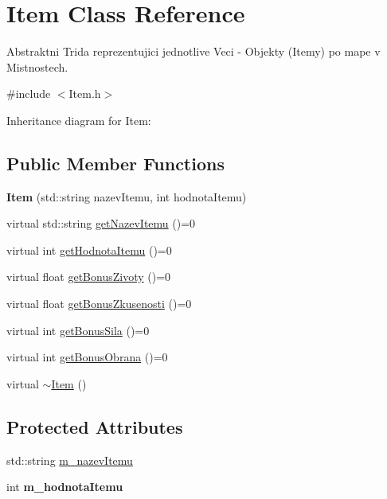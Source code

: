 \hypertarget{class_item}{\section{Item Class Reference}
\label{class_item}
}


Abstraktni Trida reprezentujici jednotlive Veci -\/ Objekty (Itemy) po mape v Mistnostech.  




{\ttfamily \#include $<$Item.\-h$>$}



Inheritance diagram for Item\-:
\subsection*{Public Member Functions}
\begin{DoxyCompactItemize}
\item 
\hypertarget{class_item_a7f5571a473f785b279be592bf086aa8b}{{\bfseries Item} (std\-::string nazev\-Itemu, int hodnota\-Itemu)}\label{class_item_a7f5571a473f785b279be592bf086aa8b}

\item 
virtual std\-::string \hyperlink{class_item_af1d886066fa410a6817ee8ec32ab8be6}{get\-Nazev\-Itemu} ()=0
\item 
virtual int \hyperlink{class_item_aa0d6f7871e3f0e3bdba941f875f59ac4}{get\-Hodnota\-Itemu} ()=0
\item 
virtual float \hyperlink{class_item_af267b55b4ed21ce91e3512f80cc96109}{get\-Bonus\-Zivoty} ()=0
\item 
virtual float \hyperlink{class_item_a004a3bc6615a7c9b31a8d0fb59d4a3ff}{get\-Bonus\-Zkusenosti} ()=0
\item 
virtual int \hyperlink{class_item_aa7b177491904b942b256491ba2551f10}{get\-Bonus\-Sila} ()=0
\item 
virtual int \hyperlink{class_item_ab02edd0e7734c6cc06af34646aa38d9a}{get\-Bonus\-Obrana} ()=0
\item 
virtual \hyperlink{class_item_a11663c84075b78c3ae5e30fdfcd7c458}{$\sim$\-Item} ()
\end{DoxyCompactItemize}
\subsection*{Protected Attributes}
\begin{DoxyCompactItemize}
\item 
std\-::string \hyperlink{class_item_a29db58e0b33aac30731d99542cd72fa5}{m\-\_\-nazev\-Itemu}
\item 
\hypertarget{class_item_aa100d258d3f1fbb2672e2f29abb53f4f}{int {\bfseries m\-\_\-hodnota\-Itemu}}\label{class_item_aa100d258d3f1fbb2672e2f29abb53f4f}

\end{DoxyCompactItemize}


